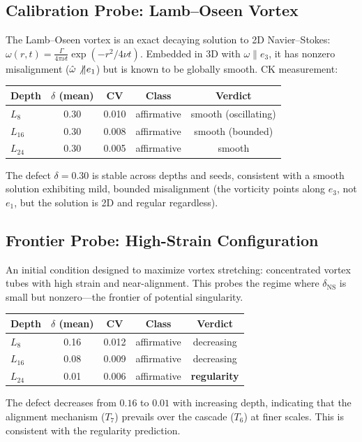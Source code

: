 \documentclass[11pt]{article}
\theoremstyle{definition}
\theoremstyle{remark}
\begin{document}
\subsection{Calibration Probe: Lamb--Oseen Vortex}

The Lamb--Oseen vortex is an exact decaying solution to 2D Navier--Stokes:
$\omega(r,t) = \frac{\Gamma}{4\pi\nu t}\exp(-r^2/4\nu t)$.  Embedded in 3D with
$\omega \| e_3$, it has nonzero misalignment ($\hat\omega \not\| e_1$) but is
known to be globally smooth.  CK measurement:
\begin{center}
\begin{tabular}{lcccc}
\hline
Depth & $\delta$ (mean) & CV & Class & Verdict \\
\hline
$L_8$  & 0.30 & 0.010 & affirmative & smooth (oscillating) \\
$L_{16}$ & 0.30 & 0.008 & affirmative & smooth (bounded) \\
$L_{24}$ & 0.30 & 0.005 & affirmative & smooth \\
\hline
\end{tabular}
\end{center}
The defect $\delta = 0.30$ is stable across depths and seeds, consistent with a
smooth solution exhibiting mild, bounded misalignment (the vorticity points along
$e_3$, not $e_1$, but the solution is 2D and regular regardless).

\subsection{Frontier Probe: High-Strain Configuration}

An initial condition designed to maximize vortex stretching: concentrated vortex tubes
with high strain and near-alignment.  This probes the regime where $\delta_{\mathrm{NS}}$
is small but nonzero---the frontier of potential singularity.
\begin{center}
\begin{tabular}{lcccc}
\hline
Depth & $\delta$ (mean) & CV & Class & Verdict \\
\hline
$L_8$  & 0.16 & 0.012 & affirmative & decreasing \\
$L_{16}$ & 0.08 & 0.009 & affirmative & decreasing \\
$L_{24}$ & 0.01 & 0.006 & affirmative & \textbf{regularity} \\
\hline
\end{tabular}
\end{center}
The defect decreases from $0.16$ to $0.01$ with increasing depth, indicating that
the alignment mechanism ($T_7$) prevails over the cascade ($T_6$) at finer scales.
This is consistent with the regularity prediction.
\end{document}

